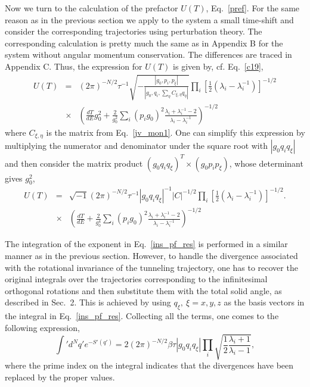\documentclass[journal=jpcafh,manuscript=article]{achemso}
\begin{document}
Now we turn to the calculation of the prefactor $U(T)$,
Eq.~\ref{pref}. For the same reason as in the previous section we
apply to the system a small time-shift and consider the corresponding
trajectories using perturbation theory.  The corresponding calculation
is pretty much the same as in Appendix B for the system without
angular momentum conservation. The differences are traced in Appendix
C. Thus, the expression for $U(T)$ is given by, cf. Eq.~\ref{c19},
\begin{eqnarray}
 \label{u_exp_am}
  U(T)&=& (2\pi)^{-N/2}\tau^{-1}
             \sqrt{-\frac{|g_0,p_i,p_\xi|}{|g_0,q_i,\sum_{\eta}C_{\xi,\eta}q_{\eta}|}}
             \prod_i\left[\frac{1}{2}(\lambda_i-\lambda_i^{-1})\right]^{-1/2}
  \\
  \nonumber
      &\times&\left(\frac{dT}{dE}g_0^2+\frac{2}{g_0^2}\sum_i (p_ig_0)^2
               \frac{\lambda_i+\lambda_i^{-1}-2}{\lambda_i-\lambda_i^{-1}}\right)^{-1/2}
\end{eqnarray}
where $C_{\xi,\eta}$ is the matrix from Eq.~\ref{jv_mon1}. One can
simplify this expression by multiplying the numerator and denominator
under the square root with $|g_0q_iq_\xi|$ and then consider the
matrix product $(g_0q_iq_\xi)^T\times(g_0p_ip_\xi)$, whose determinant
gives $g_0^2$,
\begin{eqnarray}
  \label{u_exp_am1}
  U(T)&=& \sqrt{-1}(2\pi)^{-N/2}\tau^{-1}|g_0q_iq_{\xi}|^{-1}|C|^{-1/2}
  \prod_i\left[\frac{1}{2}(\lambda_i-\lambda_i^{-1})\right]^{-1/2}.
  \\
  \nonumber
      &\times&\left(\frac{dT}{dE}+\frac{2}{g_0^4}\sum_i (p_ig_0)^2
               \frac{\lambda_i+\lambda_i^{-1}-2}{\lambda_i-\lambda_i^{-1}}\right)^{-1/2}
\end{eqnarray}

The integration of the exponent in Eq.~\ref{ins_pf_res} is performed in a
similar manner as in the previous section. However, to handle the
divergence associated with the rotational invariance of the tunneling
trajectory, one has to recover the original integrals over the
trajectories corresponding to the infinitesimal orthogonal rotations
and then substitute them with the total solid angle,
as described in Sec.~2. This is achieved by using
$q_\xi,\ \xi=x,y,z$ as the basis vectors in the integral in
Eq.~\ref{ins_pf_res}. Collecting all the terms, one comes to the
following expression,
\begin{equation}
  \label{exp_int_am}
  \int' d^N\! q' e^{-S'(q')} = 2(2\pi)^{-N/2}\beta\tau|g_0q_iq_\xi|
  \prod_i\sqrt{\frac{1}{2}\frac{\lambda_i+1}{\lambda_i-1}},
\end{equation}
where the prime index on the integral indicates that the
divergences have been replaced by the proper values.
\end{document}
